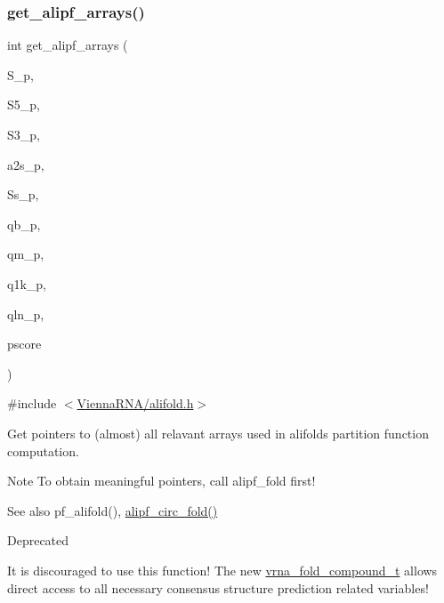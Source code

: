 \subsubsection{\texorpdfstring{get\+\_\+alipf\+\_\+arrays()}{get\_alipf\_arrays()}}
{\footnotesize\ttfamily int get\+\_\+alipf\+\_\+arrays (\begin{DoxyParamCaption}\item[{short $\ast$$\ast$$\ast$}]{S\+\_\+p,  }\item[{short $\ast$$\ast$$\ast$}]{S5\+\_\+p,  }\item[{short $\ast$$\ast$$\ast$}]{S3\+\_\+p,  }\item[{unsigned short $\ast$$\ast$$\ast$}]{a2s\+\_\+p,  }\item[{char $\ast$$\ast$$\ast$}]{Ss\+\_\+p,  }\item[{\mbox{\hyperlink{group__data__structures_ga31125aeace516926bf7f251f759b6126}{F\+L\+T\+\_\+\+O\+R\+\_\+\+D\+BL}} $\ast$$\ast$}]{qb\+\_\+p,  }\item[{\mbox{\hyperlink{group__data__structures_ga31125aeace516926bf7f251f759b6126}{F\+L\+T\+\_\+\+O\+R\+\_\+\+D\+BL}} $\ast$$\ast$}]{qm\+\_\+p,  }\item[{\mbox{\hyperlink{group__data__structures_ga31125aeace516926bf7f251f759b6126}{F\+L\+T\+\_\+\+O\+R\+\_\+\+D\+BL}} $\ast$$\ast$}]{q1k\+\_\+p,  }\item[{\mbox{\hyperlink{group__data__structures_ga31125aeace516926bf7f251f759b6126}{F\+L\+T\+\_\+\+O\+R\+\_\+\+D\+BL}} $\ast$$\ast$}]{qln\+\_\+p,  }\item[{short $\ast$$\ast$}]{pscore }\end{DoxyParamCaption})}



{\ttfamily \#include $<$\mbox{\hyperlink{alifold_8h}{Vienna\+R\+N\+A/alifold.\+h}}$>$}



Get pointers to (almost) all relavant arrays used in alifold\textquotesingle{}s partition function computation. 

\begin{DoxyNote}{Note}
To obtain meaningful pointers, call alipf\+\_\+fold first!
\end{DoxyNote}
\begin{DoxySeeAlso}{See also}
pf\+\_\+alifold(), \mbox{\hyperlink{group__consensus__pf__fold_ga604a42ad64178279551ad3e4def3d603}{alipf\+\_\+circ\+\_\+fold()}}
\end{DoxySeeAlso}
\begin{DoxyRefDesc}{Deprecated}
\item[\mbox{\hyperlink{deprecated__deprecated000024}{Deprecated}}]It is discouraged to use this function! The new \mbox{\hyperlink{group__fold__compound_ga1b0cef17fd40466cef5968eaeeff6166}{vrna\+\_\+fold\+\_\+compound\+\_\+t}} allows direct access to all necessary consensus structure prediction related variables!\end{DoxyRefDesc}



